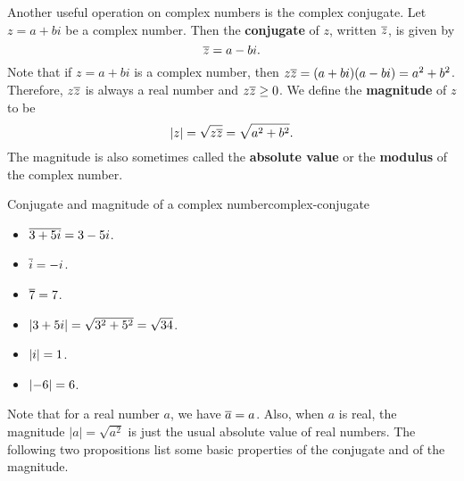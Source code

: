 Another useful operation on complex numbers is the complex
conjugate. Let $z = a+bi$ be a complex number. Then the
\textbf{conjugate}%
%
 of $z$, written $\overline{z}$, is given by
\begin{equation*}
  \overline{z} = a-bi.
\end{equation*}
Note that if $z=a+bi$ is a complex number, then
$z\overline{z} = (a+bi)(a-bi) = a^2+b^2$. Therefore, $z\overline{z}$
is always a real number and $z\overline{z}\geq 0$. We define the
\textbf{magnitude}%
 of $z$ to be
\begin{equation*}
  \left|z\right| = \sqrt{z\overline{z}} = \sqrt{a^2+b^2}.
\end{equation*}
The magnitude is also sometimes called the \textbf{absolute
  value}%
 or the
\textbf{modulus}%
 of the complex
number.

\begin{example}{Conjugate and magnitude of a complex number}{complex-conjugate}
  \begin{itemize}
  \item $\overline{3+5i} = 3-5i$.
  \item $\overline{i} = -i$.
  \item $\overline{7} = 7$.
  \item $\left|3+5i\right| = \sqrt{3^2+5^2} = \sqrt{34}$.
  \item $\left|i\right| = 1$.
  \item $\left|-6\right| = 6$.
  \end{itemize}
\end{example}

Note that for a real number $a$, we have $\overline{a}=a$. Also, when
$a$ is real, the magnitude $|a| = \sqrt{a^2}$ is just the usual
absolute value of real numbers. The following two propositions
list some basic properties of the conjugate and of the magnitude.

